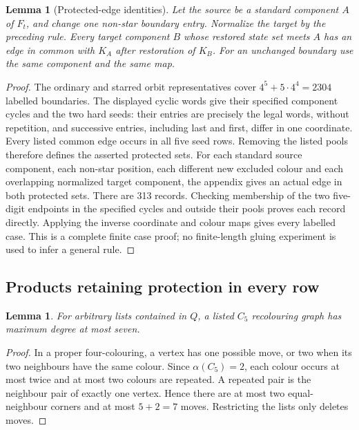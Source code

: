 \documentclass[11pt]{article}
\newtheorem{lemma}[theorem]{Lemma}
\theoremstyle{remark}
\numberwithin{equation}{section}
\begin{document}
\begin{lemma}[Protected-edge identities]\label{lem:pentagon-protection}
Let the source be a standard component $A$ of $F_t$, and change one
non-star boundary entry. Normalize the target by the preceding rule.
Every target component $B$ whose restored state set meets $A$ has an
edge in common with $K_A$ after restoration of $K_B$.
For an unchanged boundary use the same component and the same map.
\end{lemma}
\begin{proof}
The ordinary and starred orbit representatives cover
$4^5+5\cdot4^4=2304$ labelled boundaries. The displayed cyclic words
give their specified component cycles and the two hard seeds: their
entries are precisely the legal words, without repetition, and
successive entries, including last and first, differ in one coordinate.
Every listed common edge occurs in all five seed rows.
Removing the listed pools therefore defines the asserted protected sets.
For each standard source component, each non-star position, each
different new excluded colour and each overlapping normalized target
component, the appendix gives an actual edge in both protected sets.
There are 313 records. Checking membership of the two five-digit
endpoints in the specified cycles and outside their pools proves
each record directly. Applying the inverse coordinate and colour maps
gives every labelled case. This is a complete finite case proof;
no finite-length gluing experiment is used to infer a general rule.
\end{proof}

\subsection{Products retaining protection in every row}
\begin{lemma}\label{lem:listed-pentagon-degree}
For arbitrary lists contained in $Q$, a listed $C_5$ recolouring graph
has maximum degree at most seven.
\end{lemma}
\begin{proof}
In a proper four-colouring, a vertex has one possible move, or two when
its two neighbours have the same colour. Since $\alpha(C_5)=2$, each
colour occurs at most twice and at most two colours are repeated.
A repeated pair is the neighbour pair of exactly one vertex.
Hence there are at most two equal-neighbour corners and at most
$5+2=7$ moves. Restricting the lists only deletes moves.
\end{proof}
\end{document}
